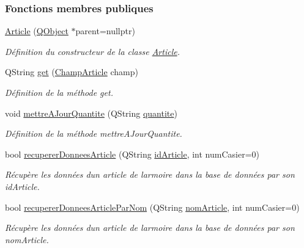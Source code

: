 \subsubsection*{Fonctions membres publiques}
\begin{DoxyCompactItemize}
\item 
\hyperlink{class_article_a27b5b7af25138f7a465215be3a9deca4}{Article} (\hyperlink{class_q_object}{Q\+Object} $\ast$parent=nullptr)
\begin{DoxyCompactList}\small\item\em Définition du constructeur de la classe \hyperlink{class_article}{Article}. \end{DoxyCompactList}\item 
Q\+String \hyperlink{class_article_a81e89d4821991a69277f3a0f8e88a001}{get} (\hyperlink{_article_8h_a159354683cfd6e1b578172fbe6490ab6}{Champ\+Article} champ)
\begin{DoxyCompactList}\small\item\em Définition de la méthode get. \end{DoxyCompactList}\item 
void \hyperlink{class_article_a5777f36d74974ff21e712a9875c2d8bf}{mettre\+A\+Jour\+Quantite} (Q\+String \hyperlink{class_article_a0870104453080b43bc271346217a864b}{quantite})
\begin{DoxyCompactList}\small\item\em Définition de la méthode mettre\+A\+Jour\+Quantite. \end{DoxyCompactList}\item 
bool \hyperlink{class_article_ae657464da12790b763659ca98a948f50}{recuperer\+Donnees\+Article} (Q\+String \hyperlink{class_article_a9f2f7a04139f26accec145066a5aacae}{id\+Article}, int num\+Casier=0)
\begin{DoxyCompactList}\small\item\em Récupère les données d\textquotesingle{}un article de l\textquotesingle{}armoire dans la base de données par son id\+Article. \end{DoxyCompactList}\item 
bool \hyperlink{class_article_a6eab145b46f5e1786c5ddf669ffabb6e}{recuperer\+Donnees\+Article\+Par\+Nom} (Q\+String \hyperlink{class_article_a0ba6c08f7dd54e4b7caf673ecd6b41a6}{nom\+Article}, int num\+Casier=0)
\begin{DoxyCompactList}\small\item\em Récupère les données d\textquotesingle{}un article de l\textquotesingle{}armoire dans la base de données par son nom\+Article. \end{DoxyCompactList}\item 

\end{DoxyCompactItemize}
